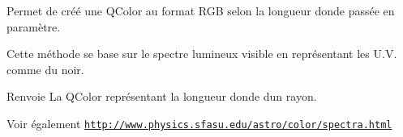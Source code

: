 Permet de créé une Q\+Color au format R\+G\+B selon la longueur d\textquotesingle{}onde passée en paramètre. 

Cette méthode se base sur le spectre lumineux visible en représentant les U.\+V. comme du noir.

\begin{DoxyReturn}{Renvoie}
La Q\+Color représentant la longueur d\textquotesingle{}onde d\textquotesingle{}un rayon.
\end{DoxyReturn}
\begin{DoxySeeAlso}{Voir également}
\href{http://www.physics.sfasu.edu/astro/color/spectra.html}{\tt http\+://www.\+physics.\+sfasu.\+edu/astro/color/spectra.\+html} 
\end{DoxySeeAlso}

